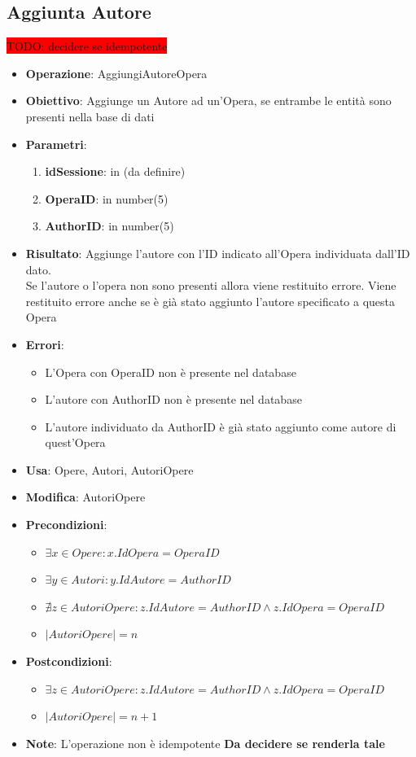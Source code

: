 \documentclass[a4paper,11pt]{article}
\begin{document}
\subsection{Aggiunta Autore} \large \colorbox{red}{TODO: decidere se idempotente}
\begin{itemize}
	\item \textbf{Operazione}: AggiungiAutoreOpera
	\item \textbf{Obiettivo}: Aggiunge un Autore ad un'Opera, se entrambe le entità sono presenti nella base di dati
	\item \textbf{Parametri}:
	\begin{enumerate}
		\item \textbf{idSessione}: in (da definire)
		\item \textbf{OperaID}: in number(5)
		\item \textbf{AuthorID}: in number(5)
	\end{enumerate}
	\item \textbf{Risultato}: Aggiunge l'autore con l'ID indicato all'Opera individuata dall'ID dato.\\
	Se l'autore o l'opera non sono presenti allora viene restituito errore.	Viene restituito errore anche se è già stato aggiunto l'autore specificato a questa Opera
	\item \textbf{Errori}: 
	\begin{itemize}
		\item L'Opera con OperaID non è presente nel database
		\item L'autore con AuthorID non è presente nel database
		\item L'autore individuato da AuthorID è già stato aggiunto come autore di quest'Opera
	\end{itemize}
	\item \textbf{Usa}: Opere, Autori, AutoriOpere
	\item \textbf{Modifica}: AutoriOpere
	\item \textbf{Precondizioni}:
	\begin{itemize}
		\item $\exists x \in Opere : x.IdOpera = OperaID$
		\item $\exists y \in Autori : y.IdAutore = AuthorID$
		\item $\nexists z \in AutoriOpere : z.IdAutore = AuthorID \land z.IdOpera = OperaID$
		\item $|AutoriOpere| = n$
	\end{itemize}
	\item \textbf{Postcondizioni}:
	\begin{itemize}
		\item $\exists z \in AutoriOpere : z.IdAutore = AuthorID \land z.IdOpera = OperaID$
		\item $|AutoriOpere| = n + 1$
	\end{itemize}
	\item \textbf{Note}: L'operazione non è idempotente \textbf{\color{red} Da decidere se renderla tale}
\end{itemize}
\end{document}
